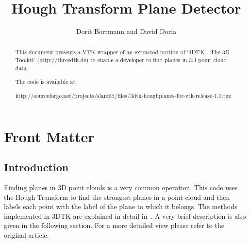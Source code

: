 \documentclass{InsightArticle}
\title{Hough Transform Plane Detector}
\author{Dorit Borrmann and David Doria}
\newcommand{\IJhandlerIDnumber}{3250}
\begin{document}
\IJhandlefooter{\IJhandlerIDnumber}


\ifpdf
\else
\fi


\maketitle


\ifhtml
\chapter*{Front Matter\label{front}}
\fi

\begin{abstract}
\noindent
This document presents a VTK wrapper of an extracted portion of `3DTK - The 3D Toolkit' (http://threedtk.de) to enable a developer to find planes in 3D point cloud data.

\vspace{14pt}

\noindent The code is available at:

\noindent http://sourceforge.net/projects/slam6d/files/3dtk-houghplanes-for-vtk-release-1.0.tgz

\end{abstract}

\IJhandlenote{\IJhandlerIDnumber}

\tableofcontents

\section{Introduction}
Finding planes in 3D point clouds is a very common operation. This code uses the
Hough Transform to find the strongest planes in a point cloud and then labels
each point with the label of the plane to which it belongs. The methods
implemented in 3DTK are explained in detail in~\cite{Borrmann:2011}. A very
brief description is also given in the following section. For a more detailed view please refer to
the original article.
\end{document}
